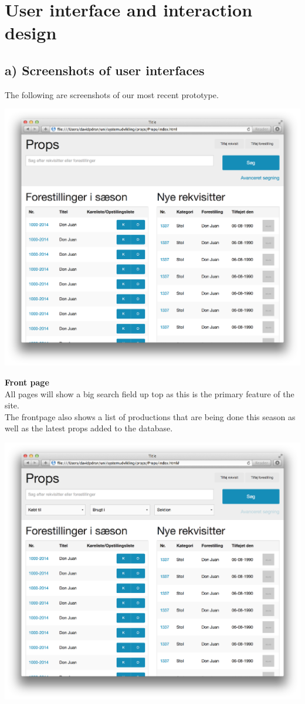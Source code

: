 \documentclass[12pt]{article}
\begin{document}
\section{User interface and interaction design}
\subsection{a) Screenshots of user interfaces}
The following are screenshots of our most recent prototype.
\newline
\newline
\centerline{\includegraphics[scale=0.25]{prototype_frontpage.png}}
\newline
\textbf{Front page}\\
All pages will show a big search field up top as this is the primary feature of the site.\\
The frontpage also shows a list of productions that are being done this season as well as the latest props added to the database.
\newline
\newline
\centerline{\includegraphics[scale=0.25]{prototype_advanced_search.png}}
\end{document}
